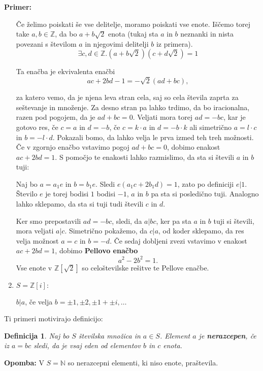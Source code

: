 \documentclass[12pt, a4paper]{article}
\newtheorem{defi}{Definicija}
\newenvironment{prim}[1][]{\par\medskip\noindent \textbf{Primer: }}{\medskip}
\newenvironment{opom}[1][]{\par\medskip\noindent \textbf{Opomba: }}{\medskip}
\begin{document}
\begin{prim}
\begin{enumerate}
Če želimo poiskati še vse delitelje, moramo poiskati vse enote. Iščemo torej take $a,b \in \mathbb{Z}$, da bo $a + b\sqrt{2}$ enota (tukaj sta $a$ in $b$ neznanki in nista povezani s številom $a$ in njegovimi delitelji $b$ iz primera).
$$
\exists c,d \in \mathbb{Z}. (a + b\sqrt{2})(c + d\sqrt{2}) = 1
$$

Ta enačba je ekvivalenta enačbi
$$
ac+2bd-1=-\sqrt{2}(ad+bc),
$$

za katero vemo, da je njena leva stran cela, saj so cela števila zaprta za seštevanje in množenje. Za desno stran pa lahko trdimo, da bo iracionalna, razen pod pogojem, da je $ad+bc=0$. Veljati mora torej $ad=-bc$, kar je gotovo res, če $c=a$ in $d=-b$, če $c=k\cdot a$ in $d=-b\cdot k$ ali simetrično $a=l\cdot c$ in $b=-l\cdot d$. Pokazali bomo, da lahko velja le prva izmed teh treh možnosti. Če v zgornjo enačbo vstavimo pogoj $ad+bc=0$, dobimo enakost $ac+2bd=1$. S pomočjo te enakosti lahko razmislimo, da sta si števili $a$ in $b$ tuji:

Naj bo $a=a_{1}e$ in $b = b_{1}e$. Sledi $e(a_{1}c + 2b_{1}d)=1$, zato po definiciji $e|1$. Število $e$ je torej bodisi $1$ bodisi $-1$, $a$ in $b$ pa sta si posledično tuji. Analogno lahko sklepamo, da sta si tuji tudi števili $c$ in $d$.

Ker smo prepostavili $ad=-bc$, sledi, da $a|bc$, ker pa sta $a$ in $b$ tuji si števili, mora veljati $a|c$. Simetrično pokažemo, da $c|a$, od koder sklepamo, da res velja možnost $a=c$ in $b=-d$. Če sedaj dobljeni zvezi vstavimo v enakost $ac+2bd=1$, dobimo \textbf{Pellovo enačbo}
$$a^{2} - 2b^{2}=1.$$
Vse enote v  $\mathbb{Z}[\sqrt{2}]$ so celoštevilske rešitve te Pellove enačbe.

\item  $S=\mathbb{Z}[i]:$

$b|a$, če velja $b=\pm 1, \pm 2, \pm 1 + \pm i,\dots$
\end{enumerate}
\end{prim}

Ti primeri motivirajo definicijo:

\begin{defi}
Naj bo $S$ številska množica in $a\in S$. Element $a$ je \mbox{\textbf{nerazcepen}}, če iz $a=bc$ sledi, da je vsaj eden od elementov $b$ in $c$ enota.
\end{defi}

\begin{opom}
V $S=\mathbb{N}$ so nerazcepni elementi, ki niso enote, praštevila.
\end{opom}
\end{document}

